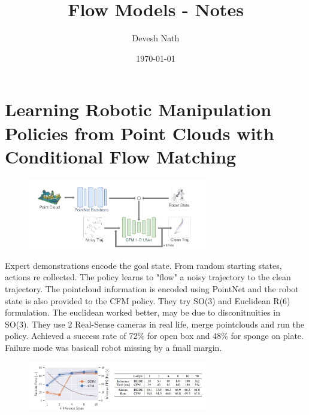 \documentclass[12pt]{article}
\title{Flow Models - Notes}
\author{Devesh Nath}
\date{\today}
\begin{document}
\maketitle

\section{Learning Robotic Manipulation Policies from Point Clouds with Conditional Flow Matching}
\begin{figure}[h!]
    \centering
    \includegraphics[width=0.7\textwidth]{1.png}
    \label{fig:example_image}
\end{figure}
Expert demonstrations encode the goal state. From random starting states, actions re collected.
The policy learns to "flow" a noisy trajectory to the clean trajectory.
The pointcloud information is encoded using PointNet and the robot state is also provided to the CFM policy. 
They try SO(3) and Euclidean R(6) formulation. The euclidean worked better, may be due to disconitnuities in SO(3). 
They use 2 Real-Sense cameras in real life, merge pointclouds and run the policy. Achieved a success rate of 72\% for open box and 48\% for sponge on plate. Failure mode was basicall robot missing by a fmall margin. 
\begin{figure}[h!]
    \centering
    \includegraphics[width=0.7\textwidth]{2.png}
    \label{fig:second_image}
\end{figure}

\newpage
\end{document}
